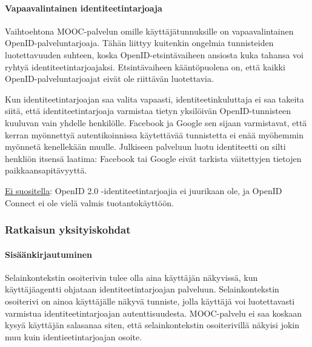 \documentclass[finnish,gradu]{tktltiki}
\begin{document}


  \paragraph{Vapaavalintainen identiteetintarjoaja} \hfill %
  \label{par:vapaavalintainen_identiteetintarjoaja}

  Vaihtoehtona MOOC-palvelun omille käyttäjätunnuksille on vapaavalintainen OpenID-palveluntarjoaja. Tähän liittyy kuitenkin ongelmia tunnisteiden luotettavuuden suhteen, koska OpenID-etsintävaiheen ansiosta kuka tahansa voi ryhtyä identiteetintarjoajaksi. Etsintävaiheen kääntöpuolena on, että kaikki OpenID-palveluntarjoajat eivät ole riittävän luotettavia.

  Kun identiteetintarjoajan saa valita vapaasti, identiteetinkuluttaja ei saa takeita siitä, että identiteetintarjoaja varmistaa tietyn yksilöivän OpenID-tunnisteen kuuluvan vain yhdelle henkilölle. Facebook ja Google sen sijaan varmistavat, että kerran myönnettyä autentikoinnissa käytettävää tunnistetta ei enää myöhemmin myönnetä kenellekään muulle. Julkiseen palveluun luotu identiteetti on silti henkliön itsensä laatima: Facebook tai Google eivät tarkista väitettyjen tietojen paikkaansapitävyyttä.

  \underline{Ei suositella}: OpenID 2.0 -identiteetintarjoajia ei juurikaan ole, ja OpenID Connect ei ole vielä valmis tuotantokäyttöön.



  \subsubsection{Ratkaisun yksityiskohdat} %
  \label{ssub:toteutuksen_yksityiskohdat}

  \paragraph{Sisäänkirjautuminen} \hfill %
  \label{par:sisäänkirjautuminen}

  Selainkontekstin osoiterivin tulee olla aina käyttäjän näkyvissä, kun käyttäjäagentti ohjataan identiteetintarjoajan palveluun. Selainkontekstin osoiterivi on ainoa käyttäjälle näkyvä tunniste, jolla käyttäjä voi luotettavasti varmistua identiteetintarjoajan autenttisuudesta. MOOC-palvelu ei saa koskaan kysyä käyttäjän salasanaa siten, että selainkontekstin osoiterivillä näkyisi jokin muu kuin identieetintarjoajan osoite.
\end{document}
